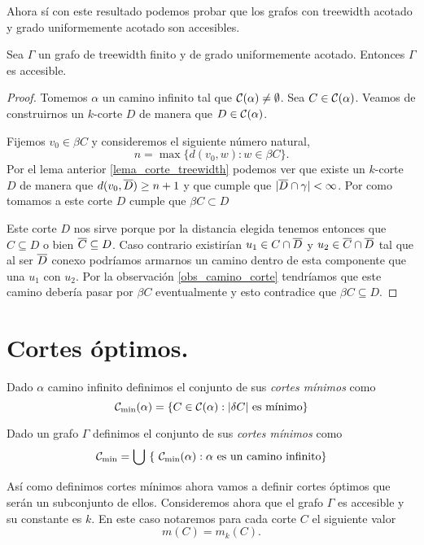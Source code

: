 \documentclass[tesis.tex]{subfiles}
\begin{document}
Ahora sí con este resultado podemos probar que los grafos con treewidth acotado y grado uniformemente acotado son accesibles.

\begin{teo}\label{teo_treewidth_fin_accesible}
	Sea $\Gamma$ un grafo de treewidth finito y de grado uniformemente acotado.
	Entonces $\Gamma$ es accesible.
\end{teo}
\begin{proof}
	Tomemos $\alpha$ un camino infinito tal que ${\cal C}(\alpha) \neq \emptyset$.
	Sea $C \in {\cal C}(\alpha)$.
	Veamos de construirnos un $k$-corte $D$ de manera que $D \in {\cal C}(\alpha)$.
	
	Fijemos $v_0  \in \beta C$ y consideremos el siguiente número natural,
	\[
	n = \max \{ d(v_0,w) : w \in \beta C  \}.
	\]
	Por el lema anterior \ref{lema_corte_treewidth} podemos ver que existe un $k$-corte $D$ de manera que $d(v_0, \overline D) \ge n+1$ y que cumple que $|\overline D \cap \gamma| < \infty$.
	Por como tomamos a este corte $D$ cumple que $\beta C \subset D$
	
	Este corte $D$ nos sirve porque por la distancia elegida tenemos entonces que $C \subseteq D$ o bien $\overline C \subseteq D$.
	Caso contrario existirían $u_1 \in C \cap \overline D$ y $u_2 \in \overline C \cap \overline D$ tal que al ser $\overline D$ conexo podríamos armarnos un camino dentro de esta componente que una $u_1$ con $u_2$.
	Por la observación \ref{obs_camino_corte} tendríamos que este camino debería pasar por $\beta C$ eventualmente y esto contradice que $\beta C \subseteq D$.
\end{proof}


\section{Cortes óptimos.}

\begin{deff}
	Dado $\alpha$ camino infinito definimos el conjunto de sus \emph{cortes mínimos} como
	\[
	\cam = \{  C \in \ca : |\delta C| \ \text{es mínimo}  \}
	\]
	
	Dado un grafo $\Gamma$ definimos el conjunto de sus \emph{cortes mínimos} como 
	\[
	{\cal C}_{\text{min}} = \bigcup \ \{ \ {\cal C}_{\text{min}}(\alpha) : \alpha \ \text{es un camino infinito}  \}
	\]
\end{deff}


Así como definimos cortes mínimos ahora vamos a definir cortes óptimos que serán un subconjunto de ellos.
Consideremos ahora que el grafo $\Gamma$ es accesible y su constante es $k$.
En este caso notaremos para cada corte $C$ el siguiente valor
\[
m(C) = m_k(C).
\]
\end{document}
